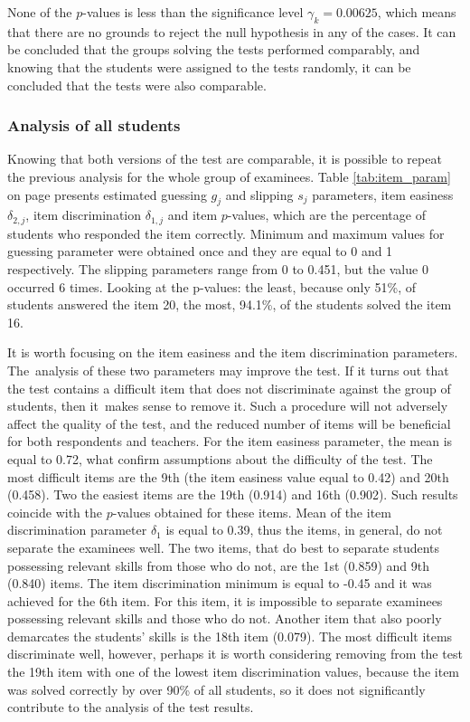 \documentclass[english]{pwr_wmat_praca_dyplomowa}
\theoremstyle{plain}
\numberwithin{theorem}{chapter}
\theoremstyle{definition}
\numberwithin{theorem}{chapter}
\begin{document}
	None of the $p$-values is less than the significance level $\gamma_k = 0.00625$, which means that there are no grounds to reject the null hypothesis in any of the cases. It can be concluded that the groups solving the tests performed comparably, and knowing that the students were assigned to the tests randomly, it can be concluded that the tests were also comparable.
	
	\subsubsection{Analysis of all students}
	
	Knowing that both versions of the test are comparable, it is possible to repeat the previous analysis for the whole group of examinees. Table \ref{tab:item_param} on page \pageref{tab:item_param} presents estimated guessing $g_j$ and slipping $s_j$ parameters, item easiness $\delta_{2,j}$, item discrimination $\delta_{1,j}$ and item $p$-values, which are the percentage of students who responded the item correctly. Minimum and maximum values for guessing parameter were obtained once and they are equal to 0 and 1 respectively. The slipping parameters range from 0 to 0.451, but the value 0 occurred 6 times. Looking at the p-values: the least, because only 51\%, of students answered the item 20, the most, 94.1\%, of the students solved the item 16. 
	
	It is worth focusing on the item easiness and the item discrimination parameters. The~analysis of these two parameters may improve the test. If it turns out that the test contains a difficult item that does not discriminate against the group of students, then it~makes sense to remove it. Such a procedure will not adversely affect the quality of the test, and the reduced number of items will be beneficial for both respondents and teachers. For the item easiness parameter, the mean is equal to 0.72, what confirm assumptions about the difficulty of the test. The most difficult items are the 9th (the item easiness value equal to 0.42) and 20th (0.458). Two the easiest items are the 19th (0.914) and 16th (0.902). Such results coincide with the $p$-values obtained for these items. Mean of the item discrimination parameter $\delta_1$ is equal to 0.39, thus the items, in general, do not separate the examinees well. The two items, that do best to separate students possessing relevant skills from those who do not, are the 1st (0.859) and 9th (0.840) items. The item discrimination minimum is equal to -0.45 and it was achieved for the 6th item. For this item, it is impossible to separate examinees possessing relevant skills and those who do not. Another item that also poorly demarcates the students' skills is the 18th item (0.079). The most difficult items discriminate well, however, perhaps it is worth considering removing from the test the 19th item with one of the lowest item discrimination values, because the item was solved correctly by over 90\% of all students, so it does not significantly contribute to the analysis of the test results.
	
\end{document}
